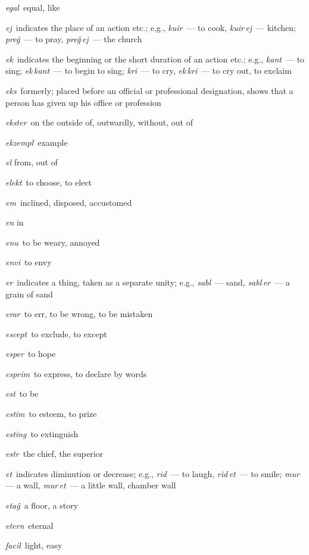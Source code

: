 \begin{landscape}
\begin{multicols}{5}
\begin{outdent}{1em}
\emph{egal\,} equal, like

\emph{ej\,} indicates the place of an action etc.; e.g., \emph{kuir\,} — to cook, \emph{kuir\,ej\,} — kitchen; \emph{preĝ\,} — to pray, \emph{preĝ\,ej\,} — the church

\emph{ek\,} indicates the beginning or the short duration of an action etc.; e.g., \emph{kant\,} — to sing; \emph{ek\,kant\,} — to begin to sing; \emph{kri\,} — to cry, \emph{ek\,kri\,} — to cry out, to exclaim

\emph{eks\,} formerly; placed before an official or professional designation, shows that a person has given up his office or profession

\emph{ekster\,} on the outside of, outwardly, without, out of

\emph{ekzempl\,} example

\emph{el} from, out of

\emph{elekt\,} to choose, to elect

\emph{em\,} inclined, disposed, accustomed

\emph{en} in

\emph{enu\,} to be weary, annoyed

\emph{envi\,} to envy

\emph{er\,} indicates a thing, taken as a separate unity; e.g., \emph{sabl\,} — sand, \emph{sabl\,er\,} — a grain of sand

\emph{erar\,} to err, to be wrong, to be mistaken

\emph{escept\,} to exclude, to except

\emph{esper\,} to hope

\emph{esprim\,} to express, to declare by words

\emph{est\,} to be

\emph{estim\,} to esteem, to prize

\emph{esting\,} to extinguish

\emph{estr\,} the chief, the superior

\emph{et\,} indicates diminution or decrease; e.g., \emph{rid\,} — to laugh, \emph{rid\,et\,} — to smile; \emph{mur\,} — a wall, \emph{mur\,et\,} — a little wall, chamber wall

\emph{etaĝ\,} a floor, a story

\emph{etern\,} eternal
\end{outdent}


\begin{outdent}{1em}
\emph{facil\,} light, easy


\end{outdent}
\end{multicols}
\end{landscape}
